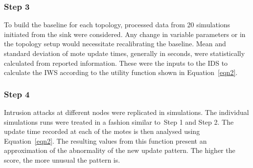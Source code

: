 \documentclass[conference,manuscript]{IEEEtran}
\begin{document}
\subsubsection*{Step 3} 
To build the baseline for each topology, processed data from 20 simulations initiated from the sink were considered.%
Any change in variable parameters or in the topology setup would necessitate recalibrating the baseline.
Mean and standard deviation of mote update times, generally in seconds, were statistically calculated from reported information. %
These were the inputs to the IDS to calculate the IWS according to the utility function shown in Equation~\ref{eqn2}. 


\subsubsection*{Step 4} 
Intrusion attacks at different nodes were replicated in simulations.
The individual simulations runs were treated in a fashion  similar to~Step 1 and Step 2.
The update time recorded at each of the motes is then analysed using Equation~\ref{eqn2}.
The resulting values from this function present an approximation of the abnormality of the new update pattern. The higher the score, the more unusual the pattern is. 
\end{document}
